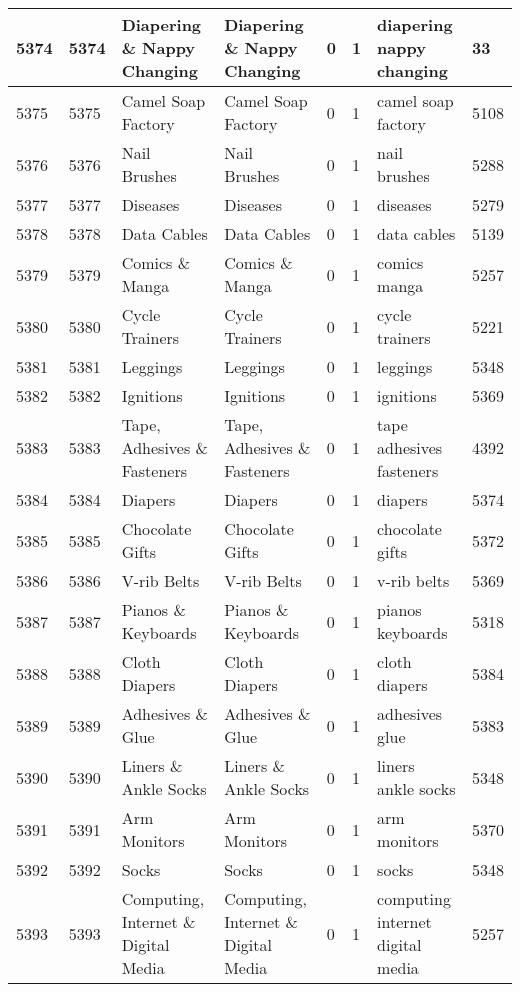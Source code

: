 \begin{longtable}{|l|l|l|l|l|l|l|l|}
5374 & 5374 & Diapering \& Nappy Changing & Diapering \& Nappy Changing & 0 & 1 & diapering nappy changing & 33 \\ \hline 
5375 & 5375 & Camel Soap Factory & Camel Soap Factory & 0 & 1 & camel soap factory & 5108 \\ \hline 
5376 & 5376 & Nail Brushes & Nail Brushes & 0 & 1 & nail brushes & 5288 \\ \hline 
5377 & 5377 & Diseases & Diseases & 0 & 1 & diseases & 5279 \\ \hline 
5378 & 5378 & Data Cables & Data Cables & 0 & 1 & data cables & 5139 \\ \hline 
5379 & 5379 & Comics \& Manga & Comics \& Manga & 0 & 1 & comics manga & 5257 \\ \hline 
5380 & 5380 & Cycle Trainers & Cycle Trainers & 0 & 1 & cycle trainers & 5221 \\ \hline 
5381 & 5381 & Leggings & Leggings & 0 & 1 & leggings & 5348 \\ \hline 
5382 & 5382 & Ignitions & Ignitions & 0 & 1 & ignitions & 5369 \\ \hline 
5383 & 5383 & Tape, Adhesives \& Fasteners & Tape, Adhesives \& Fasteners & 0 & 1 & tape adhesives fasteners & 4392 \\ \hline 
5384 & 5384 & Diapers & Diapers & 0 & 1 & diapers & 5374 \\ \hline 
5385 & 5385 & Chocolate Gifts & Chocolate Gifts & 0 & 1 & chocolate gifts & 5372 \\ \hline 
5386 & 5386 & V-rib Belts & V-rib Belts & 0 & 1 & v-rib belts & 5369 \\ \hline 
5387 & 5387 & Pianos \& Keyboards & Pianos \& Keyboards & 0 & 1 & pianos keyboards & 5318 \\ \hline 
5388 & 5388 & Cloth Diapers & Cloth Diapers & 0 & 1 & cloth diapers & 5384 \\ \hline 
5389 & 5389 & Adhesives \& Glue & Adhesives \& Glue & 0 & 1 & adhesives glue & 5383 \\ \hline 
5390 & 5390 & Liners \& Ankle Socks & Liners \& Ankle Socks & 0 & 1 & liners ankle socks & 5348 \\ \hline 
5391 & 5391 & Arm Monitors & Arm Monitors & 0 & 1 & arm monitors & 5370 \\ \hline 
5392 & 5392 & Socks & Socks & 0 & 1 & socks & 5348 \\ \hline 
5393 & 5393 & Computing, Internet \& Digital Media & Computing, Internet \& Digital Media & 0 & 1 & computing internet digital media & 5257 \\ \hline 

\end{longtable}
